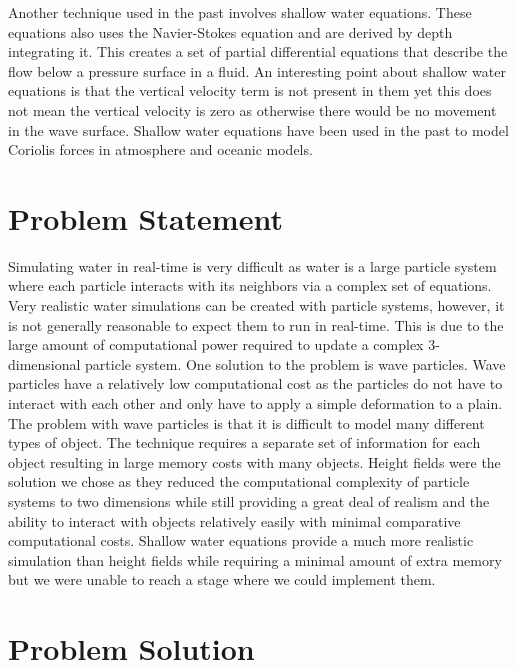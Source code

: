 \documentclass[11pt]{article}
\begin{document}
Another technique used in the past involves shallow water equations. These 
equations also uses the Navier-Stokes equation and are derived by depth 
integrating it. This creates a set of partial differential equations that 
describe the flow below a pressure surface in a fluid.  An interesting point 
about shallow water equations is that the vertical velocity term is not present 
in them yet this does not mean the vertical velocity is zero as otherwise there 
would be no movement in the wave surface. Shallow water equations have been 
used in the past to model Coriolis forces in atmosphere and oceanic models. 
\cite{shalloweq}


\section{Problem Statement}

Simulating water in real-time is very difficult as water is a large particle system where each particle interacts with its neighbors via a complex set of equations.  Very realistic water simulations can be created with particle systems, however, it is not generally reasonable to expect them to run in real-time.  This is due to the large amount of computational power required to update a complex 3-dimensional particle system.  One solution to the problem is wave particles.  Wave particles have a relatively low computational cost as the particles do not have to interact with each other and only have to apply a simple deformation to a plain.  The problem with wave particles is that it is difficult to model many different types of object.  The technique requires a separate set of information for each object resulting in large memory costs with many objects.  Height fields were the solution we chose as they reduced the computational complexity of particle systems to two dimensions while still providing a great deal of realism and the ability to interact with objects relatively easily with minimal comparative computational costs.  Shallow water equations provide a much more realistic simulation than height fields while requiring a minimal amount of extra memory but we were unable to reach a stage where we could implement them.
 
\section{Problem Solution}
\end{document}
